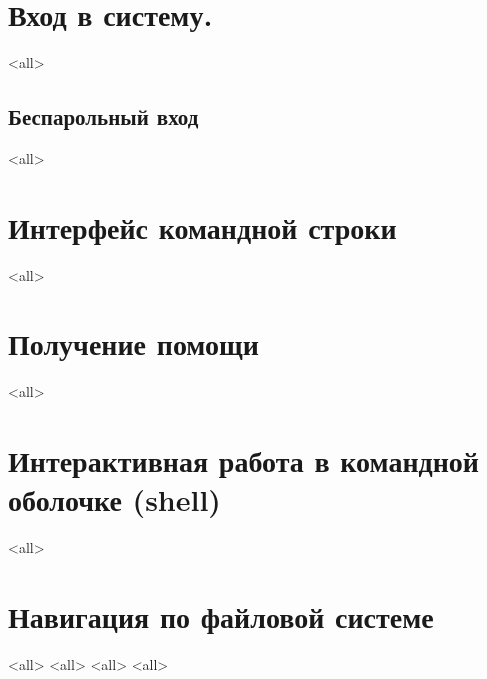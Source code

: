\section{Вход в систему.}
\mode<all>{}
\subsection{Беспарольный вход}
\mode<all>{}

\section{Интерфейс командной строки}
\mode<all>{}

\section{Получение помощи}
\mode<all>{}

\section{Интерактивная работа в командной оболочке (shell)}
\mode<all>{}

\section{Навигация по файловой системе}
\mode<all>{}
\mode<all>{}
\mode<all>{}
\mode<all>{}

\bye
